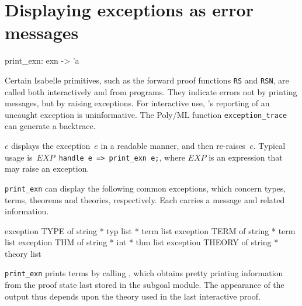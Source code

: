 \section{Displaying exceptions as error messages}
\begin{ttbox} 
print_exn: exn -> 'a
\end{ttbox}
Certain Isabelle primitives, such as the forward proof functions {\tt RS}
and {\tt RSN}, are called both interactively and from programs.  They
indicate errors not by printing messages, but by raising exceptions.  For
interactive use, \ML's reporting of an uncaught exception is 
uninformative.  The Poly/ML function {\tt exception_trace} can generate a
backtrace.

\begin{ttdescription}
\item[\ttindexbold{print_exn} $e$] 
displays the exception~$e$ in a readable manner, and then re-raises~$e$.
Typical usage is~\hbox{\tt $EXP$ handle e => print_exn e;}, where
$EXP$ is an expression that may raise an exception.

{\tt print_exn} can display the following common exceptions, which concern
types, terms, theorems and theories, respectively.  Each carries a message
and related information.
\begin{ttbox} 
exception TYPE   of string * typ list * term list
exception TERM   of string * term list
exception THM    of string * int * thm list
exception THEORY of string * theory list
\end{ttbox}
\end{ttdescription}
\begin{warn}
  {\tt print_exn} prints terms by calling , which obtains
  pretty printing information from the proof state last stored in the
  subgoal module.  The appearance of the output thus depends upon the
  theory used in the last interactive proof.
\end{warn}

